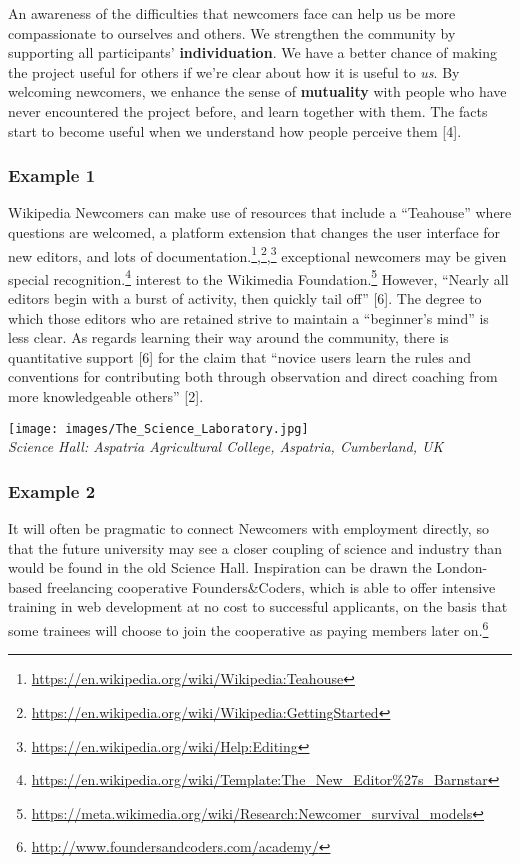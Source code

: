 An awareness of the difficulties that newcomers face can help us be more
compassionate to ourselves and others. We strengthen the community by
supporting all participants' \textbf{individuation}. We have a better
chance of making the project useful for others if we're clear about how
it is useful to \emph{us}. By welcoming newcomers, we enhance the sense
of \textbf{mutuality} with people who have never encountered the project
before, and learn together with them. The facts start to become useful
when we understand how people perceive them {{[}4{]}}.

\hypertarget{example-1}{%
\subsubsection{Example 1}\label{example-1}}

Wikipedia {{Newcomers}} can make use of resources that include a
``Teahouse'' where questions are welcomed, a platform extension that
changes the user interface for new editors, and lots of
documentation.\footnote{\url{https://en.wikipedia.org/wiki/Wikipedia:Teahouse}},\footnote{\url{https://en.wikipedia.org/wiki/Wikipedia:GettingStarted}},\footnote{\url{https://en.wikipedia.org/wiki/Help:Editing}}
exceptional newcomers may be given special recognition.\footnote{\url{https://en.wikipedia.org/wiki/Template:The_New_Editor\%27s_Barnstar}}
interest to the Wikimedia Foundation.\footnote{\url{https://meta.wikimedia.org/wiki/Research:Newcomer_survival_models}}
However, ``Nearly all editors begin with a burst of activity, then
quickly tail off'' {{[}6{]}}. The degree to which those editors who are
retained strive to maintain a ``beginner's mind'' is less clear. As
regards learning their way around the community, there is quantitative
support {{[}6{]}} for the claim that ``novice users learn the rules and
conventions for contributing both through observation and direct
coaching from more knowledgeable others'' {{[}2{]}}.

\texttt{[image: images/The\_Science\_Laboratory.jpg]}\\
\emph{Science Hall: Aspatria Agricultural College, Aspatria, Cumberland,
UK}

\hypertarget{example-2}{%
\subsubsection{Example 2}\label{example-2}}

It will often be pragmatic to connect {{Newcomers}} with employment
directly, so that the future university may see a closer coupling of
science and industry than would be found in the old Science Hall.
Inspiration can be drawn the London-based freelancing cooperative
Founders\&Coders, which is able to offer intensive training in web
development at no cost to successful applicants, on the basis that some
trainees will choose to join the cooperative as paying members later
on.\footnote{\url{http://www.foundersandcoders.com/academy/}}

